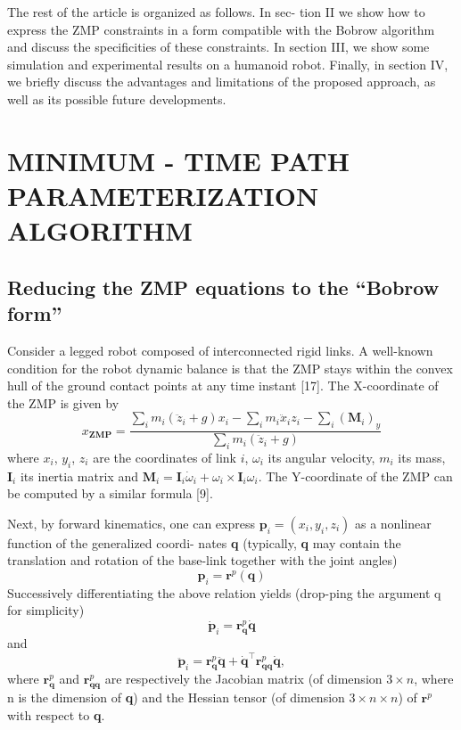 \documentclass[journal]{IEEEtran}
\begin{document}
The rest of the article is organized as follows. In sec-
tion II we show how to express the ZMP constraints in a
form compatible with the Bobrow algorithm and discuss the
specificities of these constraints. In section III, we show some
simulation and experimental results on a humanoid robot.
Finally, in section IV, we briefly discuss the advantages and
limitations of the proposed approach, as well as its possible
future developments.

\section{MINIMUM - TIME PATH PARAMETERIZATION ALGORITHM}
\subsection{Reducing the ZMP equations to the “Bobrow form”}
Consider a legged robot composed of interconnected rigid
links. A well-known condition for the robot dynamic balance
is that the ZMP stays within the convex hull of the ground
contact points at any time instant [17]. The X-coordinate of the ZMP is given by
$$
x_{\textbf{ZMP}}=\frac{\sum_{i}m_{i}(\ddot{z}_{i}+g)x_{i}-\sum_{i}m_{i}\ddot{x}_{i}z_{i}-\sum_{i}(\textbf{M}_{i})_{y}}{\sum_{i}m_{i}(\ddot{z}_{i}+g)}
$$
where $x_{i}$, $y_{i}$, $z_{i}$ are the coordinates of link $i$, $\omega_{i}$ its angular
velocity, $m_{i}$ its mass, $\textbf{I}_{i}$ its inertia matrix and $\textbf{M}_{i} = \textbf{I}_{i}\dot{\omega}_{i} + \omega_{i} \times \textbf{I}_{i}\omega_{i}$. The Y-coordinate of the ZMP can be computed by a similar formula [9].

Next, by forward kinematics, one can express $\textbf{p}_{i}=(x_{i} , y_{i} , z_{i})$ as a nonlinear function of the generalized coordi- nates \textbf{q} (typically, \textbf{q} may contain the translation and rotation of the base-link together with the joint angles)
$$
\textbf{p}_{i}=\textbf{r}^{p}(\textbf{q})
$$
Successively differentiating the above relation yields (drop-ping the argument q for simplicity)
\begin{equation}
\dot{\textbf{p}}_{i}=\textbf{r}^{p}_{\textbf{q}}\dot{\textbf{q}}
\end{equation}
and
\begin{equation}
\ddot{\textbf{p}}_{i}=\textbf{r}^{p}_{\textbf{q}}\ddot{\textbf{q}}+\dot{\textbf{q}}^{\top}\textbf{r}^{p}_{\textbf{qq}}\dot{\textbf{q}},
\end{equation}
where $\textbf{r}^{p}_{\textbf{q}}$ and $\textbf{r}^{p}_{\textbf{qq}}$ are respectively the Jacobian matrix (of
dimension $3\times n$, where n is the dimension of \textbf{q}) and the Hessian tensor (of dimension $3\times n\times n$) of $\textbf{r}^{p}$ with respect to \textbf{q}.
\end{document}
